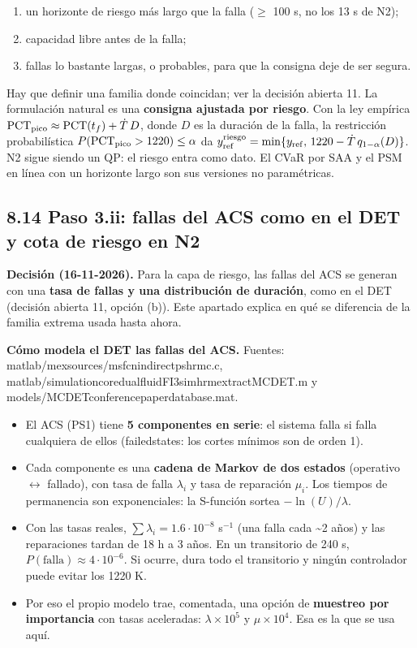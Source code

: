 \documentclass[11pt,a4paper]{article}
\newcommand{\codeus}{\textunderscore\allowbreak}
\newcommand{\code}[1]{{\small\ttfamily\let\_\codeus #1}}
\begin{document}
\begin{enumerate}
\item un horizonte de riesgo más largo que la falla ($\ge$ 100 s, no los 13 s de N2);
\item capacidad libre antes de la falla;
\item fallas lo bastante largas, o probables, para que la consigna deje de ser segura.
\end{enumerate}

Hay que definir una familia donde coincidan; ver la decisión abierta 11. La formulación natural es una \textbf{consigna ajustada por riesgo}. Con la ley empírica $\mathrm{PCT}_{\rm pico}\approx\mathrm{PCT}(t_f)+\dot T\,D$, donde $D$ es la duración de la falla, la restricción probabilística $P(\mathrm{PCT}_{\rm pico}>1220)\le\alpha$ da $y_{\rm ref}^{\rm riesgo}=\min\{y_{\rm ref},\,1220-\dot T\,q_{1-\alpha}(D)\}$. N2 sigue siendo un QP: el riesgo entra como dato. El CVaR por SAA y el PSM en línea con un horizonte largo son sus versiones no paramétricas.

\subsection*{8.14 Paso 3.ii: fallas del ACS como en el DET y cota de riesgo en N2}
\textbf{Decisión (16-11-2026).} Para la capa de riesgo, las fallas del ACS se generan con una \textbf{tasa de fallas y una distribución de duración}, como en el DET (decisión abierta 11, opción (b)). Este apartado explica en qué se diferencia de la familia extrema usada hasta ahora.

\textbf{Cómo modela el DET las fallas del ACS.} Fuentes: \code{matlab/mex\_sources/msfcn\_indirectps\_hrm\_c.c}, \code{matlab/simulation\_core\_dualfluid\_FI3\_sim\_hrm\_extract\_MCDET.m} y \code{models/MCDET\_conferencepaper\_database.mat}.

\begin{itemize}
\item El ACS (PS1) tiene \textbf{5 componentes en serie}: el sistema falla si falla cualquiera de ellos (\code{failed\_states}: los cortes mínimos son de orden 1).
\item Cada componente es una \textbf{cadena de Markov de dos estados} (operativo $\leftrightarrow$ fallado), con tasa de falla $\lambda_i$ y tasa de reparación $\mu_i$. Los tiempos de permanencia son exponenciales: la S-función sortea $-\ln(U)/\lambda$.
\item Con las tasas reales, $\sum\lambda_i=1.6\cdot10^{-8}$ s$^{-1}$ (una falla cada \textasciitilde{}2 años) y las reparaciones tardan de 18 h a 3 años. En un transitorio de 240 s, $P(\text{falla})\approx4\cdot10^{-6}$. Si ocurre, dura todo el transitorio y ningún controlador puede evitar los 1220 K.
\item Por eso el propio modelo trae, comentada, una opción de \textbf{muestreo por importancia} con tasas aceleradas: $\lambda\times10^5$ y $\mu\times10^4$. Esa es la que se usa aquí.
\end{itemize}
\end{document}
